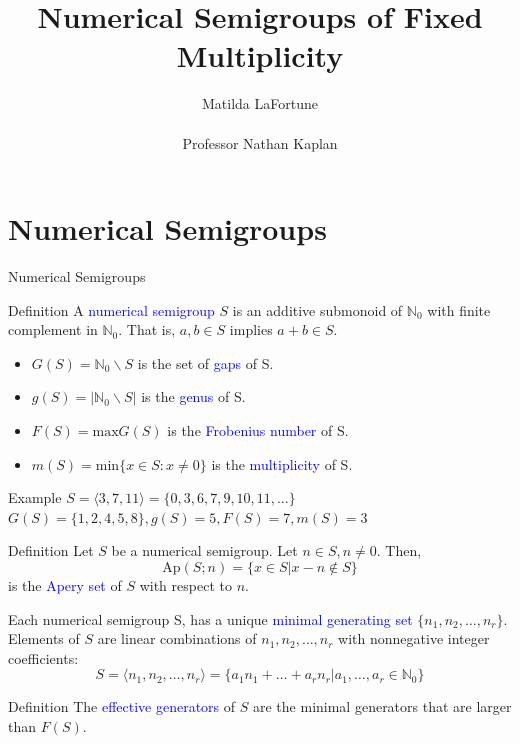 \documentclass[10pt]{beamer}
\title[Numerical Semigroups of Fixed Multiplicity]{Numerical Semigroups of Fixed Multiplicity}
\author{Matilda LaFortune \\
 \\ Professor Nathan Kaplan}
\date{}
\newcommand{\blue}[1]{\textcolor{blue}{#1}}
\newcommand{\N}{\mathbb{N}_0}
\begin{document}
\maketitle

\begin{frame}{ }
    \tableofcontents
\end{frame}
\section{Numerical Semigroups}

\begin{frame}{Numerical Semigroups}
\begin{block}{Definition}
    A \blue{numerical semigroup} $S$ is an additive submonoid of $\mathbb{N}_0$ with finite complement in $\mathbb{N}_0$. That is, $a,b \in S$ implies $a + b \in S.$ 
    \begin{itemize}
        \item $G(S) = \N \backslash S$ is the set of \blue{gaps} of S. 
        \item $g(S) = |\N \backslash S|$ is the \blue{genus} of S. 
        \item $F(S) = \text{max} G(S)$ is the \blue{Frobenius number} of S. 
        \item $m(S) = \text{min} \{ x \in S : x \neq 0\} $ is the \blue{multiplicity} of S.
    \end{itemize}
\end{block}

\begin{exampleblock}{Example}
$S = \langle 3, 7, 11 \rangle = \{ 0, 3, 6, 7, 9, 10, 11, \dots \}$
\\ $G(S) = \{1,2,4,5,8\}, g(S) = 5, F(S) = 7, m(S) = 3$
\end{exampleblock}

\begin{block}{Definition}
    Let $S$ be a numerical semigroup. Let $n \in S, n \neq 0$. Then, $$\text{Ap} (S ; n) = \{ x \in S | x - n \not \in S \}$$ is the \blue{Apery set} of $S$ with respect to $n$.  
\end{block}
\end{frame}
\begin{frame}{}
\begin{block}{}
    Each numerical semigroup S, has a unique \blue{minimal generating set} $\{n_1, n_2, \dots, n_r \}$. Elements of $S$ are linear combinations of $n_1, n_2, \dots, n_r$ with nonnegative integer coefficients: $$S = \langle n_1, n_2, \dots, n_r \rangle = \{ a_1 n_1 + \dots + a_r n_r| a_1, \dots, a_r \in \N \}$$
\end{block}

\begin{block}{Definition}
    The \blue{effective generators} of $S$ are the minimal generators that are larger than $F(S)$.
\end{block}
\end{frame}
\end{document}
